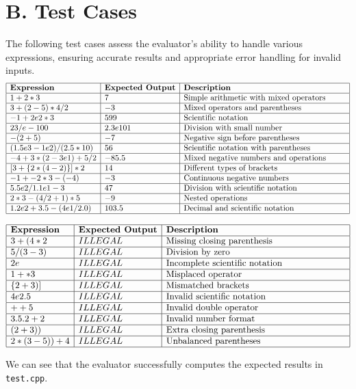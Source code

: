 \documentclass[a4paper]{article}
\begin{document}
\section*{B. Test Cases}
The following test cases assess the evaluator's ability to handle various expressions, ensuring accurate results and appropriate error handling for invalid inputs.
\[
\begin{array}{|l|l|p{7cm}|}
\hline
\textbf{Expression} & \textbf{Expected Output} & \textbf{Description} \\
\hline
1 + 2 * 3 & 7 & Simple arithmetic with mixed operators \\
\hline
3 + (2 - 5) * 4 / 2 & -3 & Mixed operators and parentheses \\
\hline
-1 + 2e2 * 3 & 599 & Scientific notation \\
\hline
23/e-100 & 2.3e101 & Division with small number \\
\hline
-(2+5) & -7 & Negative sign before parentheses \\
\hline
(1.5e3 - 1e2) / (2.5 * 10) & 56 & Scientific notation with parentheses \\
\hline
-4 + 3 * (2 - 3e1) + 5 / 2 & -85.5 & Mixed negative numbers and operations \\
\hline
[3 + \{2 * (4 - 2)\}] * 2\ & 14 & Different types of brackets \\
\hline
-1 + -2 * 3 - (-4) & -3 & Continuous negative numbers \\
\hline
5.5e2 / 1.1e1 - 3 & 47 & Division with scientific notation \\
\hline
2 * 3 - (4 / 2 + 1) * 5 & -9 & Nested operations \\
\hline
1.2e2 + 3.5 - (4e1 / 2.0) & 103.5 & Decimal and scientific notation \\
\hline
\end{array}
\]

\[
\begin{array}{|l|l|p{7cm}|}
    \hline
\textbf{Expression} & \textbf{Expected Output} & \textbf{Description} \\
\hline
3 + (4 * 2 & ILLEGAL & Missing closing parenthesis \\
\hline
5 / (3 - 3) & ILLEGAL & Division by zero \\
\hline
2e & ILLEGAL & Incomplete scientific notation \\
\hline
1 + * 3 & ILLEGAL & Misplaced operator \\
\hline
\{2 + 3)] & ILLEGAL & Mismatched brackets \\
\hline
4e2.5 & ILLEGAL & Invalid scientific notation \\
\hline
++5 & ILLEGAL & Invalid double operator \\
\hline
3.5.2 + 2 & ILLEGAL & Invalid number format \\
\hline
(2 + 3)) & ILLEGAL & Extra closing parenthesis \\
\hline
2 * (3 - 5)) + 4 & ILLEGAL & Unbalanced parentheses \\
\hline

\end{array}
\]

We can see that the evaluator successfully computes the expected results in \texttt{test.cpp}.
\end{document}
